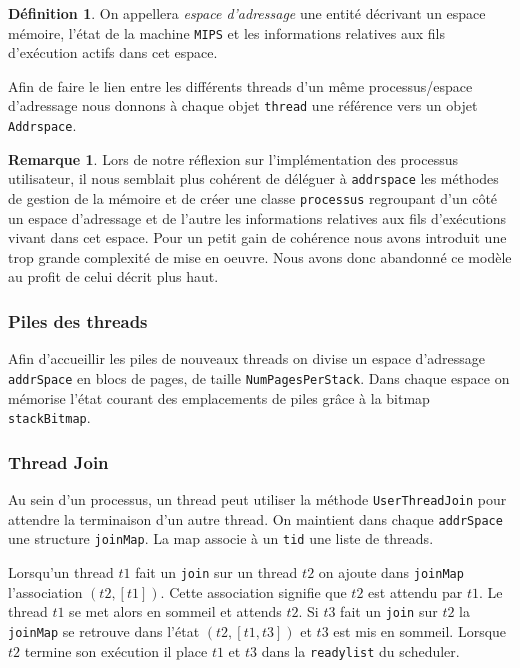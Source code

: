 \documentclass[11pt]{article}
\theoremstyle{definition}
\newtheorem*{myRem}{Remarque}
\theoremstyle{definition}
\newtheorem*{myDef}{Définition}
\begin{document}
\begin{myDef}
  On appellera \textit{espace d'adressage} une entité décrivant un espace mémoire, l'état de la machine \texttt{MIPS} et les informations relatives aux fils d'exécution actifs dans cet espace.
\end{myDef}
Afin de faire le lien entre les différents threads d'un même processus/espace d'adressage nous donnons à chaque objet \texttt{thread} une référence vers un objet \texttt{Addrspace}.
\begin{myRem}
Lors de notre réflexion sur l'implémentation des processus utilisateur, il nous semblait plus cohérent de déléguer à \texttt{addrspace} les méthodes de gestion de la mémoire et de créer une classe \texttt{processus} regroupant d'un côté un espace d'adressage et de l'autre les informations relatives aux fils d'exécutions vivant dans cet espace. Pour un petit gain de cohérence nous avons introduit une trop grande complexité de mise en oeuvre. Nous avons donc abandonné ce modèle au profit de celui décrit plus haut.
\end{myRem}

\subsubsection{Piles des threads}
Afin d'accueillir les piles de nouveaux threads on divise un espace d'adressage \texttt{addrSpace} en blocs de pages, de taille \texttt{NumPagesPerStack}.
Dans chaque espace on mémorise l'état courant des emplacements de piles grâce à la bitmap \texttt{stackBitmap}. 

\subsubsection{Thread Join}
Au sein d'un processus, un thread peut utiliser la méthode \texttt{UserThreadJoin} pour attendre la terminaison d'un autre thread.
On maintient dans chaque \texttt{addrSpace} une structure \texttt{joinMap}.
La map associe à un \texttt{tid} une liste de threads.

Lorsqu'un thread $t1$ fait un \texttt{join} sur un thread $t2$ on ajoute dans \texttt{joinMap}
l'association $(t2, [t1])$. Cette association signifie que $t2$ est attendu par $t1$.
Le thread $t1$ se met alors en sommeil et attends $t2$. 
Si $t3$ fait un \texttt{join} sur $t2$ la \texttt{joinMap} se retrouve dans l'état $(t2, [t1,t3])$ et $t3$ est mis en sommeil.
Lorsque $t2$ termine son exécution il place $t1$ et $t3$ dans la \texttt{readylist} du scheduler.
\end{document}
